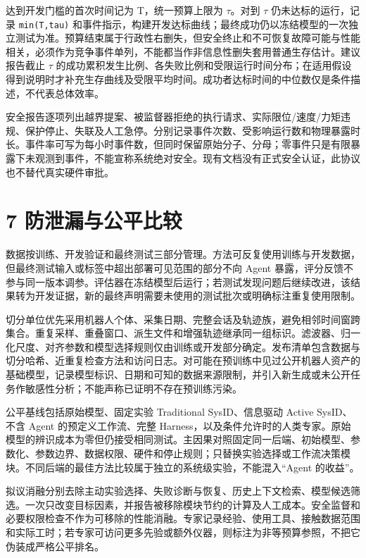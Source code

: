 \documentclass[
  chinese,
  11pt,
  a4paper,
  fontset=fandol]{ctexart}
\begin{document}
达到开发门槛的首次时间记为 T，统一预算上限为 \(\tau\)。对到 \(\tau\)
仍未达标的运行，记录 \texttt{min(T,tau)}
和事件指示，构建开发达标曲线；最终成功仍以冻结模型的一次独立测试为准。预算结束属于行政性右删失，但安全终止和不可恢复故障可能与性能相关，必须作为竞争事件单列，不能都当作非信息性删失套用普通生存估计。建议报告截止
\(\tau\)
的成功累积发生比例、各失败比例和受限运行时间分布；在适用假设得到说明时才补充生存曲线及受限平均时间。成功者达标时间的中位数仅是条件描述，不代表总体效率。

安全报告逐项列出越界提案、被监督器拒绝的执行请求、实际限位/速度/力矩违规、保护停止、失联及人工急停。分别记录事件次数、受影响运行数和物理暴露时长。事件率可写为每小时事件数，但同时保留原始分子、分母；零事件只是有限暴露下未观测到事件，不能宣称系统绝对安全。现有文档没有正式安全认证，此协议也不替代真实硬件审批。

\section{7
防泄漏与公平比较}\label{ux9632ux6cc4ux6f0fux4e0eux516cux5e73ux6bd4ux8f83}

数据按训练、开发验证和最终测试三部分管理。方法可反复使用训练与开发数据，但最终测试输入或标签中超出部署可见范围的部分不向
Agent
暴露，评分反馈不参与同一版本调参。评估器在冻结模型后运行；若测试发现问题后继续改进，该结果转为开发证据，新的最终声明需要未使用的测试批次或明确标注重复使用限制。

切分单位优先采用机器人个体、采集日期、完整会话及轨迹族，避免相邻时间窗跨集合。重复采样、重叠窗口、派生文件和增强轨迹继承同一组标识。滤波器、归一化尺度、对齐参数和模型选择规则仅由训练或开发部分确定。发布清单包含数据与切分哈希、近重复检查方法和访问日志。对可能在预训练中见过公开机器人资产的基础模型，记录模型标识、日期和可知的数据来源限制，并引入新生成或未公开任务作敏感性分析；不能声称已证明不存在预训练污染。

公平基线包括原始模型、固定实验 Traditional SysID、信息驱动 Active
SysID、不含 Agent 的预定义工作流、完整
Harness，以及条件允许时的人类专家。原始模型的辨识成本为零但仍接受相同测试。主因果对照固定同一后端、初始模型、参数化、参数边界、数据权限、硬件和停止规则；只替换实验选择或工作流决策模块。不同后端的最佳方法比较属于独立的系统级实验，不能混入``Agent
的收益''。

拟议消融分别去除主动实验选择、失败诊断与恢复、历史上下文检索、模型候选筛选。一次只改变目标因素，并报告被移除模块节约的计算及人工成本。安全监督和必要权限检查不作为可移除的性能消融。专家记录经验、使用工具、接触数据范围和实际工时；若专家可访问更多先验或额外仪器，则标注为非等预算参照，不把它伪装成严格公平排名。
\end{document}
